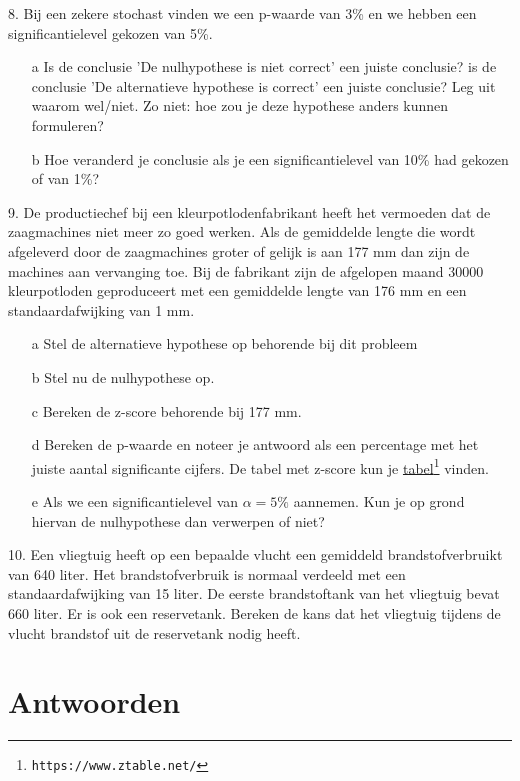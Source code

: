8. Bij een zekere stochast vinden we een p-waarde van 3\% en we hebben een significantielevel gekozen van 5\%.
\begin{itemize}
\item[a] Is de conclusie 'De nulhypothese is niet correct' een juiste conclusie? is de conclusie 'De alternatieve hypothese is correct' een juiste conclusie? Leg uit waarom wel/niet. Zo niet: hoe zou je deze hypothese anders kunnen formuleren?
\item[b] Hoe veranderd je conclusie als je een significantielevel van 10\% had gekozen of van 1\%?
\end{itemize}

  
9. De productiechef bij een kleurpotlodenfabrikant heeft het vermoeden dat de zaagmachines niet meer zo goed werken. Als de gemiddelde lengte die wordt afgeleverd door de zaagmachines groter of gelijk is aan 177 mm dan zijn de machines aan vervanging toe.
Bij de fabrikant zijn de afgelopen maand 30000 kleurpotloden geproduceert met een gemiddelde lengte van 176 mm en een standaardafwijking van 1 mm.
\begin{itemize}
  \item[a] Stel de alternatieve hypothese op behorende bij dit probleem
\item[b] Stel nu de nulhypothese op.
\item[c] Bereken de z-score behorende bij 177 mm.
\item[d] Bereken de p-waarde en noteer je antwoord als een percentage met het juiste aantal significante cijfers. De tabel met z-score kun je  \href{https://www.ztable.net/}{\color{blue}tabel}\footnote{\texttt{https://www.ztable.net/}} vinden.
\item[e] Als we een significantielevel van $\alpha=5\%$ aannemen. Kun je op grond hiervan de nulhypothese dan verwerpen of niet?
\end{itemize}


10. Een vliegtuig heeft op een bepaalde vlucht een gemiddeld brandstofverbruikt van 640 liter. Het brandstofverbruik is normaal verdeeld met een standaardafwijking van 15 liter. De eerste brandstoftank van het vliegtuig bevat 660 liter. Er is ook een reservetank. Bereken de kans dat het vliegtuig tijdens de vlucht brandstof uit de reservetank nodig heeft.


\section{Antwoorden}
\label{/tussentoets-iii/antwoorden}


